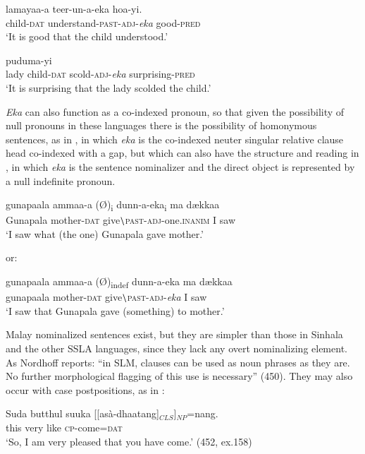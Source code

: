 \ea\label{ex3.6.4} 
\gll  lamayaa-{\dott}a teer-un-a-eka ho{\und}a-yi.\\
  child-\textsc{dat} understand-\textsc{past}-\textsc{adj}-\textit{eka} good-\textsc{pred} \\
  `It is good that the child understood.'
\z



\ea\label{ex3.6.5} 
  puduma-yi\\
  lady  child-\textsc{dat} scold-\textsc{adj}-\textit{eka}  surprising-\textsc{pred} \\
  `It is surprising that the lady scolded the child.'
\z


\textit{Eka} can also function as a co-indexed pronoun, so that given the possibility of null pronouns in these languages there is the possibility of homonymous sentences, as in , in which \textit{eka} is the co-indexed neuter singular relative clause head co-indexed with a gap, but which can also have the structure and reading in , in which \textit{eka} is  the sentence nominalizer  and the direct object is represented by a null indefinite pronoun.


\ea\label{ex3.6.6} 
\gll  gunapaala ammaa-{\dott}a ({\O})\textsubscript{i} dunn-a-eka\textsubscript{i}  ma{\ng} d{\ae}kkaa\\
  Gunapala  mother-\textsc{dat} {} give{$\backslash$}\textsc{past}-\textsc{adj}-one.\textsc{inanim} I saw\\
  `I saw what (the one) Gunapala gave mother.'
\z


or:


\ea\label{ex3.6.7} 
\gll gunapaala ammaa-{\dott}a ({\O})\textsubscript{indef} dunn-a-eka  ma{\ng} d{\ae}kkaa\\
  gunapaala mother-\textsc{dat}  {}  give{$\backslash$}\textsc{past}-\textsc{adj}-\textit{eka}  I saw\\
  `I saw that Gunapala gave (something) to mother.'
\z


 Malay nominalized sentences exist, but they are simpler than those in Sinhala and the other SSLA languages, since they lack any overt nominalizing element. As Nordhoff reports: ``in SLM, clauses can be used as noun phrases as they are. No further morphological flagging of this use is necessary'' (450). 
 They may also occur with case postpositions, as in :


\ea\label{ex3.6.8} 
\gll Suda butthul suuka [[asà-dhaatang]$_{CLS}$]$_{NP}$=nang.\\
  this very  like \textsc{cp}-come=\textsc{dat}\\
  `So, I am very pleased that you have come.'  (452, ex.158)
\z



